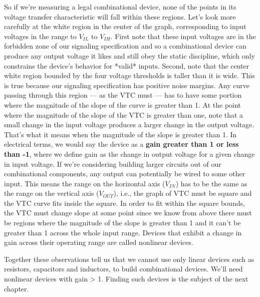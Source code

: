 \documentclass[a4paper,twoside]{article}
\numberwithin{equation}{section}
\begin{document}
So if we're measuring a legal combinational device, none of the points in its voltage transfer characteristic
will fall within these regions.
Let's look more carefully at the white region in the center of the graph, corresponding to input voltages in
the range to $V_{IL}$ to $V_{IH}$. First note that these input voltages are in the forbidden zone of our
signaling specification and so a combinational device can produce any output voltage it likes and still
obey the static discipline, which only constrains the device's behavior for *valid* inputs.
Second, note that the center white region bounded by the four voltage thresholds is taller than it is wide.
This is true because our signaling specification has positive noise margins.
Any curve passing through this region — as the VTC must — has to have some portion where the magnitude of
the slope of the curve is greater than 1. At the point where the magnitude of the slope of the VTC is
greater than one, note that a small change in the input voltage produces a larger change in the output
voltage. That's what it means when the magnitude of the slope is greater than 1. In electrical terms,
we would say the device as a \textbf{gain greater than 1 or less than -1}, where we define gain as the
change in output voltage for a given change in input voltage.
If we're considering building larger circuits out of our combinational components, any output can
potentially be wired to some other input. This means the range on the horizontal axis ($V_{IN}$)
has to be the same as the range on the vertical axis ($V_{OUT}$), i.e., the graph of VTC must be
square and the VTC curve fits inside the square. In order to fit within the square bounds,
the VTC must change slope at some point since we know from above there must be regions where the
magnitude of the slope is greater than 1 and it can't be greater than 1 across the whole input range.
Devices that exhibit a change in gain across their operating range are called nonlinear devices.

Together these observations tell us that we cannot use only linear devices such as resistors, capacitors and inductors, to build combinational devices. We'll need nonlinear devices with gain > 1. Finding such devices is the subject of the next chapter.
\end{document}
